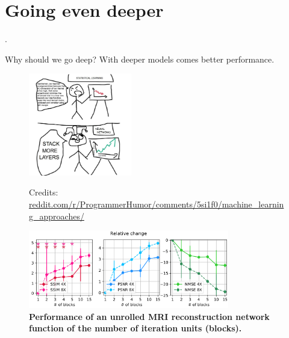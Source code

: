 \section{Going even deeper}

\begin{frame}[plain,c]

    \begin{center}
        \color{DarkBlue}
    \Huge \thesection. \insertsection
    \end{center}

\end{frame}


\begin{frame}{Why should we go deep?}
    With deeper models comes better performance.
    \begin{figure}
        \begin{overprint}
            \centering\includegraphics[width=0.4\textwidth]{Figures/shine_figures/more_layers.jpg}\caption{Credits: \href{reddit.com/r/ProgrammerHumor/comments/5si1f0/machine_learning_approaches/}{reddit.com/r/ProgrammerHumor/comments/5si1f0/machine\_learning\_approaches/}}
            \centering\includegraphics[width=0.78\textwidth]{Figures/shine_figures/pezzotti.png}\caption{\textbf{Performance of an unrolled MRI reconstruction network function of the number of iteration units (blocks).}\footnotemark}
        \end{overprint}
    \end{figure}
    \vspace{-4em}
\end{frame}

